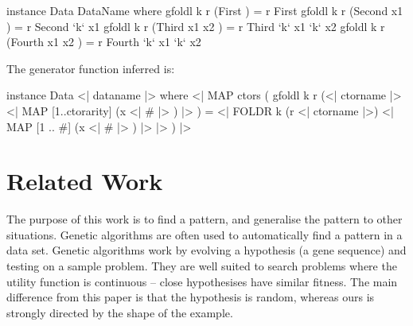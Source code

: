 \documentclass{llncs}
\begin{document}
\begin{code}
instance Data DataName where
    gfoldl k r (First          ) = r First
    gfoldl k r (Second  x1     ) = r Second  `k` x1
    gfoldl k r (Third   x1 x2  ) = r Third   `k` x1 `k` x2
    gfoldl k r (Fourth  x1 x2  ) = r Fourth  `k` x1 `k` x2
\end{code}

\noindent The generator function inferred is:

\begin{code}
instance Data \? <| dataname |> where
    <| MAP ctors (
        gfoldl k r
            (<| ctorname |> \? <| MAP [1..ctorarity] (x <| # |> ) |> ) =
            <| FOLDR k (r \? <| ctorname |>)
                <| MAP [1 .. #] (x <| # |> ) |>
            |>
    ) |>
\end{code}


\begin{comment}

\subsection{The Serial class}

The |Serial| class is used by SmallCheck \cite{smallcheck} to automatically perform enumerative testing. The definition relies on the arities of each constructor, and does not induct over the the components of a constructor.

\begin{code}
instance Serial alpha => Serial (DataName alpha) where
    series = cons0 First \/ cons1 Second \/ cons2 Third \/ cons2 Fourth
\end{code}

\end{comment}

\section{Related Work}
\label{sec:related}




The purpose of this work is to find a pattern, and generalise the pattern to other situations. Genetic algorithms \cite{genetic_algorithms} are often used to automatically find a pattern in a data set. Genetic algorithms work by evolving a hypothesis (a gene sequence) and testing on a sample problem. They are well suited to search problems where the utility function is continuous -- close hypothesises have similar fitness. The main difference from this paper is that the hypothesis is random, whereas ours is strongly directed by the shape of the example.
\end{document}
